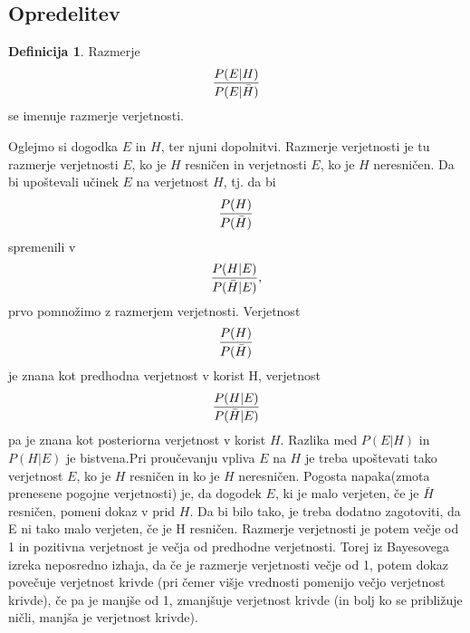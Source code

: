 \documentclass[12pt,a4paper]{amsart}
\theoremstyle{definition} %
\newtheorem{definicija}{Definicija}[section]
\theoremstyle{plain} %
\begin{document}
\subsection{Opredelitev}

\begin{definicija}
    Razmerje
    \begin{equation}
        \frac{P(E \lvert H)}{P(E \lvert \bar{H})} \vspace{2mm}
    \end{equation}
     se imenuje razmerje verjetnosti. \\
 \end{definicija}
 Oglejmo si dogodka $E$ in $H$, ter njuni dopolnitvi. Razmerje verjetnosti je tu razmerje verjetnosti $E$, ko je $H$ resničen in verjetnosti $E$,
 ko je $H$ neresničen. Da bi upoštevali učinek $E$ na verjetnost $H$, tj. da bi
 \[
    \frac{P(H)}{P(\bar{H})} \vspace{2mm}
 \]
 spremenili v
 \[
    \frac{P(H \lvert E)}{P(\bar{H} \lvert E)}, \vspace{2mm}
 \]
 prvo pomnožimo z razmerjem verjetnosti. Verjetnost
 \[
    \frac{P(H)}{P(\bar{H})} \vspace{2mm}
 \]
 je znana kot predhodna verjetnost v korist H, verjetnost
 \[
    \frac{P(H \lvert E)}{P(\bar{H} \lvert E)} \vspace{2mm}
 \]
 pa je znana kot posteriorna verjetnost v korist $H$. Razlika med $P(E \lvert H)$ in $P(H \lvert E)$ je bistvena.Pri proučevanju vpliva
 $E$ na $H$ je treba upoštevati tako verjetnost $E$, ko je $H$ resničen in ko je $H$ neresničen. Pogosta napaka(zmota prenesene pogojne
 verjetnosti) je, da dogodek $E$, ki je malo verjeten, če je $\bar{H}$ resničen, pomeni dokaz v prid $H$. Da bi bilo tako, je treba dodatno
 zagotoviti, da E ni tako malo verjeten, če je H resničen. Razmerje verjetnosti je potem večje od 1 in pozitivna verjetnost je večja od
 predhodne verjetnosti. Torej iz Bayesovega izreka neposredno izhaja, da če je razmerje verjetnosti večje od 1, potem dokaz povečuje
 verjetnost krivde (pri čemer višje vrednosti pomenijo večjo verjetnost krivde), če pa je manjše od 1, zmanjšuje verjetnost krivde
 (in bolj ko se približuje ničli, manjša je verjetnost krivde).

\end{document}
